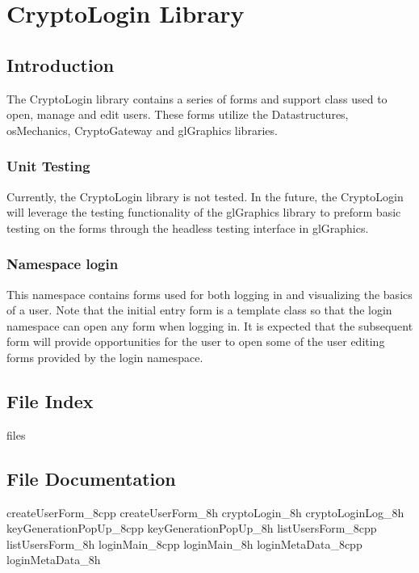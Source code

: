 \part{CryptoLogin Library} \label{sec:cryptologin}

	\chapter{Introduction}

	The CryptoLogin library contains a series of forms and support class used to open, manage and edit users.  These forms utilize the Datastructures, osMechanics, CryptoGateway and glGraphics libraries.

		\section{Unit Testing} \label{sec:unit-testing}
		Currently, the CryptoLogin library is not tested.  In the future, the CryptoLogin will leverage the testing functionality of the glGraphics library to preform basic testing on the forms through the headless testing interface in glGraphics.
		
		\section{Namespace login} \label{sec:Namespace}
		This namespace contains forms used for both logging in and visualizing the basics of a user.  Note that the initial entry form is a template class so that the login namespace can open any form when logging in.  It is expected that the subsequent form will provide opportunities for the user to open some of the user editing forms provided by the login namespace.
		
		\renewcommand{\DOXYGENFOLDER}{../../CryptoLogin/Documentation/doxygenFiles/latex/}

	\chapter{File Index}
		{files}
	
	\chapter{File Documentation}
	
		{createUserForm_8cpp}
		{createUserForm_8h}
		{cryptoLogin_8h}
		{cryptoLoginLog_8h}
		{keyGenerationPopUp_8cpp}
		{keyGenerationPopUp_8h}
		{listUsersForm_8cpp}
		{listUsersForm_8h}
		{loginMain_8cpp}
		{loginMain_8h}
		{loginMetaData_8cpp}
		{loginMetaData_8h}